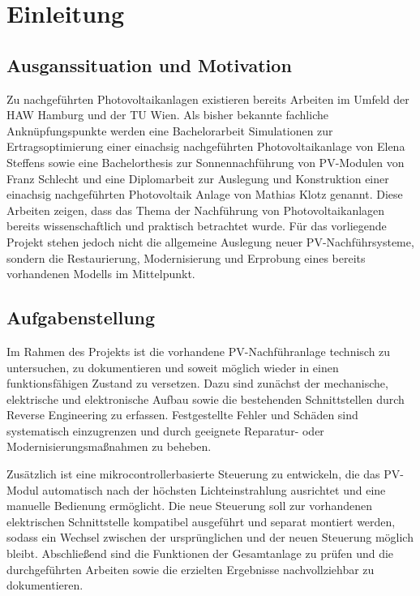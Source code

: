 \chapter{Einleitung}\label{ch:einleitung}


\section{Ausganssituation und Motivation}\label{sec:ausganssituation-und-motivation}

Zu nachgeführten Photovoltaikanlagen existieren bereits Arbeiten im Umfeld der HAW Hamburg und der TU Wien.
Als bisher bekannte fachliche Anknüpfungspunkte werden eine Bachelorarbeit Simulationen zur Ertragsoptimierung einer einachsig nachgeführten Photovoltaikanlage von Elena Steffens sowie eine Bachelorthesis zur Sonnennachführung von PV-Modulen von Franz Schlecht und eine Diplomarbeit zur Auslegung und Konstruktion einer einachsig nachgeführten Photovoltaik Anlage von Mathias Klotz genannt.
Diese Arbeiten zeigen, dass das Thema der Nachführung von Photovoltaikanlagen bereits wissenschaftlich und praktisch betrachtet wurde.
Für das vorliegende Projekt stehen jedoch nicht die allgemeine Auslegung neuer PV-Nachführsysteme, sondern die Restaurierung, Modernisierung und Erprobung eines bereits vorhandenen Modells im Mittelpunkt.

\section{Aufgabenstellung}\label{sec:aufgabenstellung}

Im Rahmen des Projekts ist die vorhandene PV-Nachführanlage technisch zu untersuchen, zu dokumentieren und soweit möglich wieder in einen funktionsfähigen Zustand zu versetzen.
Dazu sind zunächst der mechanische, elektrische und elektronische Aufbau sowie die bestehenden Schnittstellen durch Reverse Engineering zu erfassen.
Festgestellte Fehler und Schäden sind systematisch einzugrenzen und durch geeignete Reparatur- oder Modernisierungsmaßnahmen zu beheben.

Zusätzlich ist eine mikrocontrollerbasierte Steuerung zu entwickeln, die das PV-Modul automatisch nach der höchsten Lichteinstrahlung ausrichtet und eine manuelle Bedienung ermöglicht.
Die neue Steuerung soll zur vorhandenen elektrischen Schnittstelle kompatibel ausgeführt und separat montiert werden, sodass ein Wechsel zwischen der ursprünglichen und der neuen Steuerung möglich bleibt.
Abschließend sind die Funktionen der Gesamtanlage zu prüfen und die durchgeführten Arbeiten sowie die erzielten Ergebnisse nachvollziehbar zu dokumentieren.

